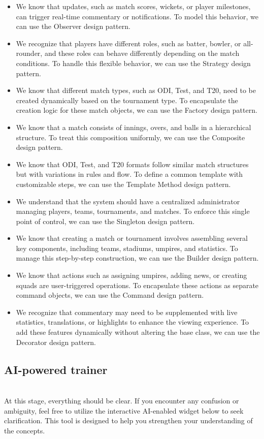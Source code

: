 \begin{itemize}
\item
We know that updates, such as match scores, wickets, or player milestones, can trigger real-time commentary or notifications. To model this behavior, we can use the Observer design pattern.
\item
We recognize that players have different roles, such as batter, bowler, or all-rounder, and these roles can behave differently depending on the match conditions. To handle this flexible behavior, we can use the Strategy design pattern.
\item
We know that different match types, such as ODI, Test, and T20, need to be created dynamically based on the tournament type. To encapsulate the creation logic for these match objects, we can use the Factory design pattern.
\item
We know that a match consists of innings, overs, and balls in a hierarchical structure. To treat this composition uniformly, we can use the Composite design pattern.
\item
We know that ODI, Test, and T20 formats follow similar match structures but with variations in rules and flow. To define a common template with customizable steps, we can use the Template Method design pattern.
\item
We understand that the system should have a centralized administrator managing players, teams, tournaments, and matches. To enforce this single point of control, we can use the Singleton design pattern.
\item
We know that creating a match or tournament involves assembling several key components, including teams, stadiums, umpires, and statistics. To manage this step-by-step construction, we can use the Builder design pattern.
\item
We know that actions such as assigning umpires, adding news, or creating squads are user-triggered operations. To encapsulate these actions as separate command objects, we can use the Command design pattern.
\item
We recognize that commentary may need to be supplemented with live statistics, translations, or highlights to enhance the viewing experience. To add these features dynamically without altering the base class, we can use the Decorator design pattern.
\end{itemize}

\subsection{AI-powered trainer}\label{wnc_KWs5zLRxQHzYG2ybF}
\\
At this stage, everything should be clear. If you encounter any confusion or ambiguity, feel free to utilize the interactive AI-enabled widget below to seek clarification. This tool is designed to help you strengthen your understanding of the concepts.


